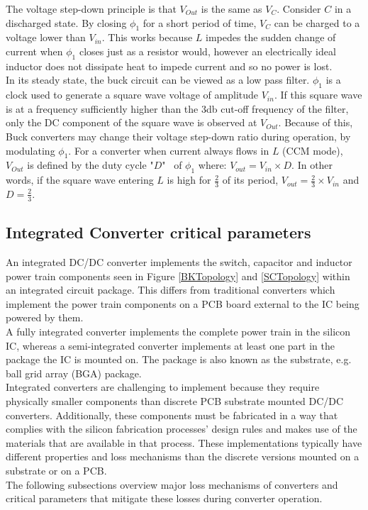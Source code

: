 \documentclass[letterpaper,twocolumn,10pt]{article}
\begin{document}
The voltage step-down principle is that $V_{Out}$ is the same as $V_C$. Consider $C$ in a discharged state. By closing $\phi_1$ for a short period of time, $V_C$ can be charged to a voltage lower than $V_{in}$. This works because $L$ impedes the sudden change of current when $\phi_1$ closes just as a resistor would, however an electrically ideal inductor does not dissipate heat to impede current and so no power is lost.\\

In its steady state, the buck circuit can be viewed as a low pass filter. $\phi_1$ is a clock used to generate a square wave voltage of amplitude $V_{in}$. If this square wave is at a frequency sufficiently higher than the 3db cut-off frequency of the filter, only the DC component of the square wave is observed at $V_{Out}$. Because of this, Buck converters may change their voltage step-down ratio during operation, by modulating $\phi_1$. For a converter when current always flows in $L$ (CCM mode), $V_{Out}$ is defined by the duty cycle "$D$"~\cite{Kurson2006} of $\phi_1$ where: $V_{out} = V_{in} \times D$. In other words, if the square wave entering $L$ is high for $\frac{2}{3}$ of its period, $V_{out} = \frac{2}{3}\times V_{in}$ and $D = \frac{2}{3}$.\\ 

\subsection{Integrated Converter critical parameters}

An integrated DC/DC converter implements the switch, capacitor and inductor power train components seen in Figure \ref{BKTopology} and \ref{SCTopology} within an integrated circuit package. This differs from traditional converters which implement the power train components on a PCB board external to the IC being powered by them.\\
A fully integrated converter implements the complete power train in the silicon IC, whereas a semi-integrated converter implements at least one part in the package the IC is mounted on. The package is also known as the substrate, e.g. ball grid array (BGA) package.\\
Integrated converters are challenging to implement because they require physically smaller components than discrete PCB substrate mounted DC/DC converters. Additionally, these components must be fabricated in a way that complies with the silicon fabrication processes' design rules and makes use of the materials that are available in that process. These implementations typically have different properties and loss mechanisms than the discrete versions mounted on a substrate or on a PCB.\\
The following subsections overview major loss mechanisms of converters and critical parameters that mitigate these losses during converter operation.
\end{document}
